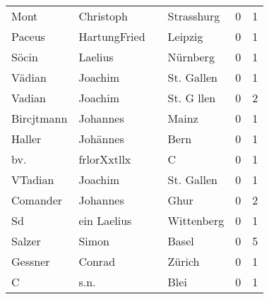 \begin{center}
\begin{tiny}
\begin{longtabu}{llllrr}
                     Mont &                          Christoph &             &                                  Strasshurg &          0 &         1 \\
                   Paceus &                       HartungFried &             &                                     Leipzig &          0 &         1 \\
                    Söcin &                            Laelius &             &                                    Nürnberg &          0 &         1 \\
                   Vädian &                            Joachim &             &                                  St. Gallen &          0 &         1 \\
                   Vadian &                            Joachim &             &                                  St. G llen &          0 &         2 \\
               Bircjtmann &                           Johannes &             &                                       Mainz &          0 &         1 \\
                   Haller &                           Johännes &             &                                        Bern &          0 &         1 \\
                      bv. &                        frlorXxtllx &             &                                           C &          0 &         1 \\
                  VTadian &                            Joachim &             &                                  St. Gallen &          0 &         1 \\
                 Comander &                           Johannes &             &                                        Ghur &          0 &         2 \\
                       Sd &                        ein Laelius &             &                                  Wittenberg &          0 &         1 \\
                   Salzer &                              Simon &             &                                       Basel &          0 &         5 \\
                  Gessner &                             Conrad &             &                                      Zürich &          0 &         1 \\
                        C &                               s.n. &             &                                        Blei &          0 &         1 \\

\end{longtabu}
\end{tiny}
\end{center}
